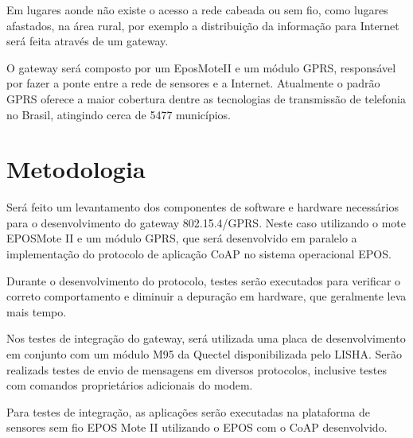 Em lugares aonde n\~ao existe o acesso a rede cabeada ou sem fio, como lugares afastados, na \'area rural, por exemplo a distribui\c{c}\~ao da informa\c{c}\~ao para Internet ser\'a feita atrav\'es de um gateway.

O gateway ser\'a composto por um EposMoteII e um m\'odulo GPRS, respons\'avel por fazer a ponte entre a rede de sensores e a Internet. Atualmente o padr\~ao GPRS oferece a maior cobertura dentre as tecnologias de transmiss\~ao de telefonia no Brasil, atingindo cerca de 5477 munic\'ipios.\cite{coberturaGPRS}


\section{Metodologia}

Ser\'a feito um levantamento dos componentes de software e hardware necess\'arios para o desenvolvimento do gateway 802.15.4/GPRS. Neste caso utilizando o mote EPOSMote II e um m\'odulo GPRS, que ser\'a desenvolvido em paralelo a implementa\c{c}\~ao do protocolo de aplica\c{c}\~ao CoAP no sistema operacional EPOS.

Durante o desenvolvimento do protocolo, testes ser\~ao executados para verificar o correto comportamento e diminuir a depura\c{c}\~ao em hardware, que geralmente leva mais tempo.

Nos testes de integra\c{c}\~ao do gateway, ser\'a utilizada uma placa de desenvolvimento em conjunto com um m\'odulo M95 da Quectel disponibilizada pelo LISHA. Ser\~ao realizads testes de envio de mensagens em diversos protocolos, inclusive testes com comandos propriet\'arios adicionais do modem.

Para testes de integra\c{c}\~ao, as aplica\c{c}\~oes ser\~ao executadas na plataforma de sensores sem fio EPOS Mote II utilizando o EPOS com o CoAP desenvolvido.
